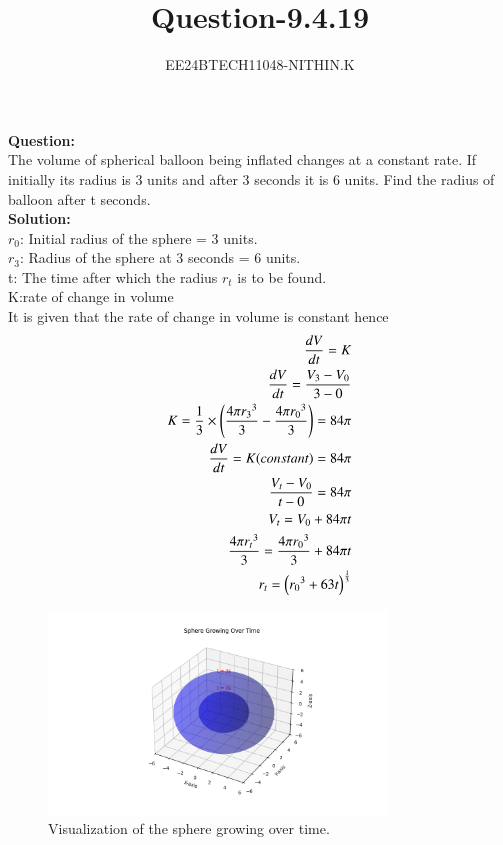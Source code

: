 \documentclass[journal]{IEEEtran}
\numberwithin{equation}{enumi}
\numberwithin{figure}{enumi}
\begin{document}


\title{Question-9.4.19}
\author{EE24BTECH11048-NITHIN.K} 
{\let\newpage\relax\maketitle}
\textbf{Question:} \\
  The volume of spherical balloon being inflated changes at a constant rate. If initially its radius is 3 units and after 3 seconds it is 6 units. Find the radius of balloon after t seconds. \\ 

\textbf{Solution:} \\
$r_0$: Initial radius of the sphere = 3 units. \\
$r_3$: Radius of the sphere at 3 seconds = 6 units. \\
t: The time after which the radius $r_t$ is to be found. \\
K:rate of change in volume \\
  It is given that the rate of change in volume is constant hence \\
  \begin{align*}
	  \frac{dV}{dt} = K \\
	  \frac{dV}{dt} = \frac{V_3 - V_0}{3-0} \\
	  K = \frac{1}{3} \times \left(\frac{4\pi {r_3}^3}{3} - \frac{4\pi {r_0}^3}{3}\right) = 84\pi \\
	  \frac{dV}{dt} = K(constant) = 84\pi \\
	  \frac{V_t - V_0}{t-0} = 84\pi \\
	  V_t = V_0 + 84\pi t \\
	  \frac{4\pi {r_t}^3}{3} = \frac{4\pi {r_0}^3}{3} + 84\pi t \\ 
	  r_t = \left({r_0}^3 + 63t\right)^{\frac{1}{3}}
  \end{align*}

\begin{figure}[H]
    \centering
    \includegraphics[width=0.8\textwidth]{figs/growing_sphere.png}
    \caption{Visualization of the sphere growing over time.}
\end{figure}
\end{document}
